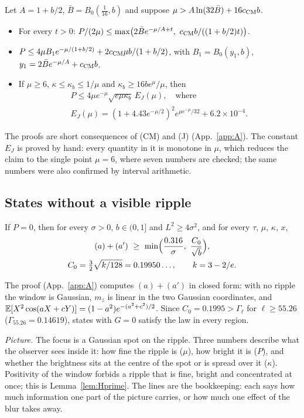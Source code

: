 \begin{lemma} \proofst
\label{lem:DI}
Let $A=1+b/2$, $\bar B=B_0(\tfrac1{16},b)$ and suppose $\mu>A\ln(32\bar B)+16c_{\rm CM}b$.
\begin{itemize}
\item[(v)] For every $t>0$: $P/(2\mu)\le\max\bigl(2\bar Be^{-\mu/A+t},\ c_{\rm CM}b/((1+b/2)t)\bigr)$.
\item[(iv)] $P\le4\mu B_1e^{-\mu/(1+b/2)}+2c_{\rm CM}\mu b/(1+b/2)$, with $B_1=B_0(y_1,b)$, $y_1=2\bar Be^{-\mu/A}+c_{\rm CM}b$.
\item[(K)] If $\mu\ge6$, $\kappa\le\kappa_b\le1/\mu$ and $\kappa_b\ge16be^{\mu}/\mu$, then
\begin{gather}
P\le4\mu e^{-\mu}\sqrt{e\mu\kappa_b}\,E_J(\mu),\quad\text{where}\nonumber\\ E_J(\mu)=(1+4.43e^{-\mu/2})^2e^{\mu e^{-\mu}/32}+6.2\times10^{-4}.
\end{gather}
\end{itemize}
\end{lemma}

The proofs are short consequences of (CM) and (J) (App.~\ref{app:A}).
The constant $E_J$ is proved by hand: every quantity in it is monotone in $\mu$, which reduces the claim to the single point $\mu=6$, where seven numbers are checked; the same numbers were also confirmed by interval arithmetic.

\subsection{States without a visible ripple}

\begin{lemma}[$G=0$] \proofst
\label{lem:G0}
If $P=0$, then for every $\sigma>0$, $b\in(0,1]$ and $L^2\ge4\sigma^2$, and for every $\tau$, $\mu$, $\kappa$, $x$,
\begin{gather}
(a)+(a')\ \ge\ \min\Bigl(\frac{0.316}{\sigma},\ \frac{C_0}{\sqrt b}\Bigr),\nonumber\\ C_0=\tfrac32\sqrt{k/128}=0.19950\ldots,\qquad k=3-2/e.
\end{gather}
\end{lemma}

The proof (App.~\ref{app:A}) computes $(a)+(a')$ in closed form: with no ripple the window is Gaussian, $m_z$ is linear in the two Gaussian coordinates, and $\mathbb{E}[X^2\cos(aX+cY)]=(1-a^2)e^{-(a^2+c^2)/2}$.
Since $C_0=0.1995>\Gamma_\ell$ for $\ell\ge55.26$ ($\Gamma_{55.26}=0.14619$), states with $G=0$ satisfy the law in every region.

\emph{Picture.}
The focus is a Gaussian spot on the ripple.
Three numbers describe what the observer sees inside it: how fine the ripple is ($\mu$), how bright it is ($P$), and whether the brightness sits at the centre of the spot or is spread over it ($\kappa$).
Positivity of the window forbids a ripple that is fine, bright and concentrated at once; this is Lemma~\ref{lem:Hprime}.
The lines are the bookkeeping: each says how much information one part of the picture carries, or how much one effect of the blur takes away.
